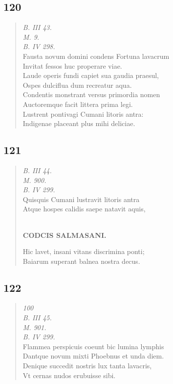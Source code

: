 \documentclass[11pt, a4paper]{report}
\begin{document}
            \subsection*{120}
      \begin{verse}
      \textit{B. III 43.} \\ \textit{M. 9.} \\ \textit{B. IV 298.} \\ Fausta novum domini condens Fortuna lavacrum \\ Invitat fessos huc properare viae. \\ Laude operis fundi capiet sua gaudia praesul, \\ Ospes dulciflua dum recreatur aqua. \\ Condentis monstrant versus primordia nomen \\ Auctoremque facit littera prima legi. \\ Lustrent pontivagi Cumani litoris antra: \\ Indigenae placeant plus mihi deliciae. \\ 
      \end{verse}
  
            \subsection*{121}
      \begin{verse}
      \textit{B. III 44.} \\ \textit{M. 900.} \\ \textit{B. IV 299.} \\ Quisquis Cumani lustravit litoris antra \\ Atque hospes calidis saepe natavit aquis, \\ 
        ﻿\pagebreak 
    \begin{center} \textbf{CODCIS SALMASANI.} \end{center} \marginpar{[135]} Hic lavet, insani vitans discrimina ponti; \\ Baiarum superant balnea nostra decus. \\ 
      \end{verse}
  
            \subsection*{122}
      \begin{verse}
      \textit{100} \\ \textit{B. III 45.} \\ \textit{M. 901.} \\ \textit{B. IV 299.} \\ Flammea perspicuis coeunt bic lumina lymphis \\ Dantque novum mixti Phoebnus et unda diem. \\ Denique succedit nostris lux tanta lavacris, \\ Vt cernas nudos erubuisse sibi. \\ 
      \end{verse}
  
\end{document}
